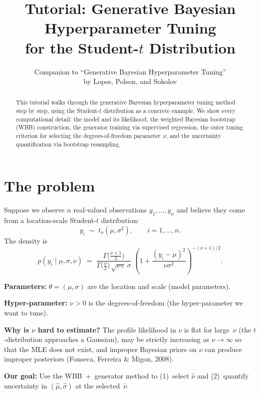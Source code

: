 \documentclass[12pt]{article}
\title{Tutorial: Generative Bayesian Hyperparameter Tuning\\for the Student-$t$ Distribution}
\author{Companion to ``Generative Bayesian Hyperparameter Tuning''\\by Lopes, Polson, and Sokolov}
\date{}
\begin{document}
\maketitle

\begin{abstract}
\noindent This tutorial walks through the generative Bayesian hyperparameter tuning method step by step, using the Student-$t$ distribution as a concrete example.  We show every computational detail: the model and its likelihood, the weighted Bayesian bootstrap (WBB) construction, the generator training via supervised regression, the outer tuning criterion for selecting the degrees-of-freedom parameter~$\nu$, and the uncertainty quantification via bootstrap resampling.
\end{abstract}

\tableofcontents

\section{The problem}

Suppose we observe $n$ real-valued observations $y_1,\ldots,y_n$ and believe they come from a location-scale Student-$t$ distribution:
\[
y_i \;\sim\; t_\nu(\mu,\sigma^2), \qquad i=1,\ldots,n.
\]
The density is
\[
p(y_i \mid \mu,\sigma,\nu) \;=\; \frac{\Gamma\!\bigl(\frac{\nu+1}{2}\bigr)}{\Gamma\!\bigl(\frac{\nu}{2}\bigr)\,\sqrt{\nu\pi}\,\sigma}\;\left(1+\frac{(y_i-\mu)^2}{\nu\sigma^2}\right)^{-(\nu+1)/2}.
\]

\textbf{Parameters:}  $\theta = (\mu,\sigma)$ are the location and scale (model parameters).

\textbf{Hyper-parameter:}  $\nu > 0$ is the degrees-of-freedom (the hyper-parameter we want to tune).

\textbf{Why is $\nu$ hard to estimate?}  The profile likelihood in $\nu$ is flat for large~$\nu$ (the $t$-distribution approaches a Gaussian), may be strictly increasing as $\nu\to\infty$ so that the MLE does not exist, and improper Bayesian priors on $\nu$ can produce improper posteriors (Fonseca, Ferreira \& Migon, 2008).

\textbf{Our goal:}  Use the WBB~+~generator method to (1)~select $\hat\nu$ and (2)~quantify uncertainty in $(\hat\mu,\hat\sigma)$ at the selected~$\hat\nu$.

\end{document}
